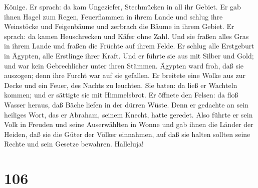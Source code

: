Könige.  Er sprach: da kam Ungeziefer, Stechmücken in all
ihr Gebiet.  Er gab ihnen Hagel zum Regen, Feuerflammen in
ihrem Lande  und schlug ihre Weinstöcke und Feigenbäume und
zerbrach die Bäume in ihrem Gebiet.  Er sprach: da kamen
Heuschrecken und Käfer ohne Zahl.  Und sie fraßen alles
Gras in ihrem Lande und fraßen die Früchte auf ihrem Felde.
 Er schlug alle Erstgeburt in Ägypten, alle Erstlinge ihrer
Kraft.  Und er führte sie aus mit Silber und Gold; und war
kein Gebrechlicher unter ihren Stämmen.  Ägypten ward froh,
daß sie auszogen; denn ihre Furcht war auf sie gefallen. 
Er breitete eine Wolke aus zur Decke und ein Feuer, des Nachts zu
leuchten.  Sie baten: da ließ er Wachteln kommen; und er
sättigte sie mit Himmelsbrot.  Er öffnete den Felsen: da
floß Wasser heraus, daß Bäche liefen in der dürren Wüste. 
Denn er gedachte an sein heiliges Wort, das er Abraham, seinem Knecht,
hatte geredet.  Also führte er sein Volk in Freuden und
seine Auserwählten in Wonne  und gab ihnen die Länder der
Heiden, daß sie die Güter der Völker einnahmen,  auf daß
sie halten sollten seine Rechte und sein Gesetze bewahren. Halleluja!

\hypertarget{section-105}{%
\section{106}\label{section-105}}

